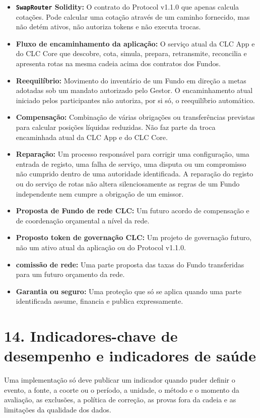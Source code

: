 \documentclass[11pt]{article}
\begin{document}
\begin{itemize}[leftmargin=*]
\item \textbf{\texttt{SwapRouter} Solidity:} O contrato do Protocol v1.1.0 que apenas calcula cotações. Pode calcular uma cotação através de um caminho fornecido, mas não detém ativos, não autoriza tokens e não executa trocas.
\item \textbf{Fluxo de encaminhamento da aplicação:} O serviço atual da CLC App e do CLC Core que descobre, cota, simula, prepara, retransmite, reconcilia e apresenta rotas na mesma cadeia acima dos contratos dos Fundos.
\item \textbf{Reequilíbrio:} Movimento do inventário de um Fundo em direção a metas adotadas sob um mandato autorizado pelo Gestor. O encaminhamento atual iniciado pelos participantes não autoriza, por si só, o reequilíbrio automático.
\item \textbf{Compensação:} Combinação de várias obrigações ou transferências previstas para calcular posições líquidas reduzidas. Não faz parte da troca encaminhada atual da CLC App e do CLC Core.
\item \textbf{Reparação:} Um processo responsável para corrigir uma configuração, uma entrada de registo, uma falha de serviço, uma disputa ou um compromisso não cumprido dentro de uma autoridade identificada. A reparação do registo ou do serviço de rotas não altera silenciosamente as regras de um Fundo independente nem cumpre a obrigação de um emissor.
\item \textbf{Proposta de Fundo de rede CLC:} Um futuro acordo de compensação e de coordenação orçamental a nível da rede.
\item \textbf{Proposto token de governação CLC:} Um projeto de governação futuro, não um ativo atual da aplicação ou do Protocol v1.1.0.
\item \textbf{comissão de rede:} Uma parte proposta das taxas do Fundo transferidas para um futuro orçamento da rede.
\item \textbf{Garantia ou seguro:} Uma proteção que só se aplica quando uma parte identificada assume, financia e publica expressamente.
\end{itemize}

\section*{14. Indicadores-chave de desempenho e indicadores de saúde}

Uma implementação só deve publicar um indicador quando puder definir o evento, a fonte, a coorte ou o período, a unidade, o método e o momento da avaliação, as exclusões, a política de correção, as provas fora da cadeia e as limitações da qualidade dos dados.
\end{document}
